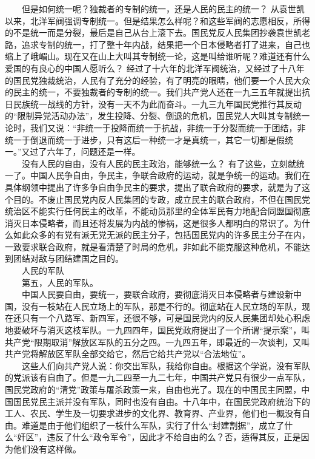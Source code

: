 \documentclass[cn,11pt,chinese]{elegantbook}
\begin{document}
　　但是如何统一呢？独裁者的专制的统一，还是人民的民主的统一？ 从袁世凯以来，北洋军阀强调专制统一。但是结果怎么样呢？和这些军阀的志愿相反，所得的不是统一而是分裂，最后是自己从台上滚下去。国民党反人民集团抄袭袁世凯老路，追求专制的统一，打了整十年内战，结果把一个日本侵略者打了进来，自己也缩上了峨嵋山。现在又在山上大叫其专制统一论，这是叫给谁听呢？难道还有什么爱国的有良心的中国人愿听么？ 经过了十六年的北洋军阀统治，又经过了十八年的国民党独裁统治，人民有了充分的经验，有了明亮的眼睛，他们要一个人民大众的民主的统一，不要独裁者的专制的统一。我们共产党人还在一九三五年就提出抗日民族统一战线的方针，没有一天不为此而奋斗。一九三九年国民党推行其反动的“限制异党活动办法”，发生投降、分裂、倒退的危机，国民党人大叫其专制统一论时，我们又说：“非统一于投降而统一于抗战，非统一于分裂而统一于团结，非统一于倒退而统一于进步，只有这后一种统一才是真统一，其它一切都是假统一。”又过了六年了，问题还是一样。\\
　　没有人民的自由，没有人民的民主政治，能够统一么？ 有了这些，立刻就统一了。中国人民争自由，争民主，争联合政府的运动，就是争统一的运动。我们在具体纲领中提出了许多争自由争民主的要求，提出了联合政府的要求，就是为了这个目的。不废止国民党内反人民集团的专政，成立民主的联合政府，不但在国民党统治区不能实行任何民主的改革，不能动员那里的全体军民有力地配合同盟国彻底消灭日本侵略者，而且还将发展为内战的惨祸，这是很多人都明白的常识了。为什么如此众多的有党有派无党无派的民主分子，包括国民党内的许多民主分子在内，一致要求联合政府，就是看清楚了时局的危机，非如此不能克服这种危机，不能达到团结对敌与团结建国之目的。\\
　　人民的军队\\
　　第五，人民的军队。\\
　　中国人民要自由，要统一，要联合政府，要彻底消灭日本侵略者与建设新中国，没有一枝站在人民立场上的军队，那是不行的。彻底站在人民立场的军队，现在还只有一个八路军、新四军，还很不够，可是国民党内的反人民集团却处心积虑地要破坏与消灭这枝军队。一九四四年，国民党政府提出了一个所谓“提示案”，叫共产党“限期取消”解放区军队的五分之四。一九四五年，即最近的一次谈判，又叫共产党将解放区军队全部交给它，然后它给共产党以“合法地位”。\\
　　这些人们向共产党人说：你交出军队，我给你自由。根据这个学说，没有军队的党派该有自由了。但是一九二四至一九二七年，中国共产党只有很少一点军队，国民党政府的“清党”政策与屠杀政策一来，自由也光了。现在的中国民主同盟，中国国民党民主派并没有军队，同时也没有自由。十八年中，在国民党政府统治下的工人、农民、学生及一切要求进步的文化界、教育界、产业界，他们也一概没有自由。难道是由于他们组织了一枝什么军队，实行了什么“封建割据”，成立了什么“奸区”，违反了什么“政令军令”，因此才不给自由的么？否，适得其反，正是因为他们没有这样做。\\
\end{document}
